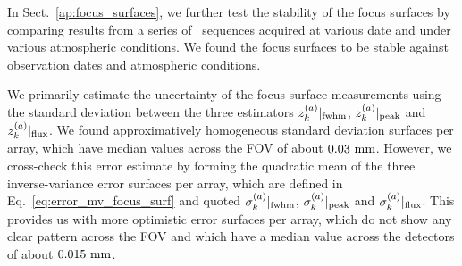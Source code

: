 In Sect.~\ref{ap:focus_surfaces}, we further test the stability of the
focus surfaces by comparing results from a series of \bm\
sequences acquired at various date and under various atmospheric
conditions. We found the focus surfaces to be stable against
observation dates and atmospheric conditions.
 
We primarily estimate the uncertainty of the focus
surface measurements using the standard deviation between the three
estimators $z_k^{(a)}|_{\rm{fwhm}}$, $z_k^{(a)}|_{\rm{peak}}$ and
$z_k^{(a)}|_{\rm{flux}}$. We found approximatively homogeneous
standard deviation surfaces per array, which have median values across
the FOV of about $0.03~\rm{mm}$.
However, we cross-check this error estimate by forming the quadratic mean of
the three inverse-variance error surfaces per array, which are defined in
Eq.~\ref{eq:error_mv_focus_surf} and quoted
$\sigma_k^{(a)}|_{\rm{fwhm}}$, $\sigma_k^{(a)}|_{\rm{peak}}$ and
$\sigma_k^{(a)}|_{\rm{flux}}$. This provides us with more optimistic
error surfaces per array, which do not show any clear pattern across
the FOV and which have a median value across the detectors of about
$0.015~\rm{mm}$.  




